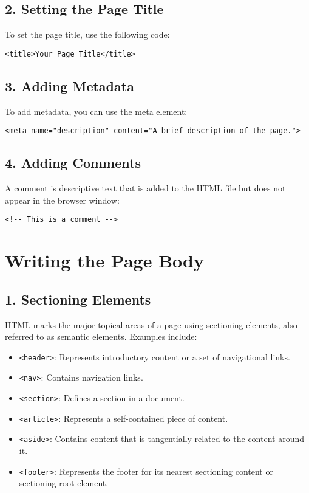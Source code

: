 \documentclass{article}
\begin{document}
\subsection*{2. Setting the Page Title}
To set the page title, use the following code:
\begin{lstlisting}
<title>Your Page Title</title>
\end{lstlisting}

\subsection*{3. Adding Metadata}
To add metadata, you can use the meta element:
\begin{lstlisting}
<meta name="description" content="A brief description of the page.">
\end{lstlisting}

\subsection*{4. Adding Comments}
A comment is descriptive text that is added to the HTML file but does not appear in the browser window:
\begin{lstlisting}
<!-- This is a comment -->
\end{lstlisting}

\section{Writing the Page Body}
\subsection*{1. Sectioning Elements}
HTML marks the major topical areas of a page using sectioning elements, also referred to as semantic elements. Examples include:
\begin{itemize}
    \item \texttt{<header>}: Represents introductory content or a set of navigational links.
    \item \texttt{<nav>}: Contains navigation links.
    \item \texttt{<section>}: Defines a section in a document.
    \item \texttt{<article>}: Represents a self-contained piece of content.
    \item \texttt{<aside>}: Contains content that is tangentially related to the content around it.
    \item \texttt{<footer>}: Represents the footer for its nearest sectioning content or sectioning root element.
\end{itemize}
\end{document}
